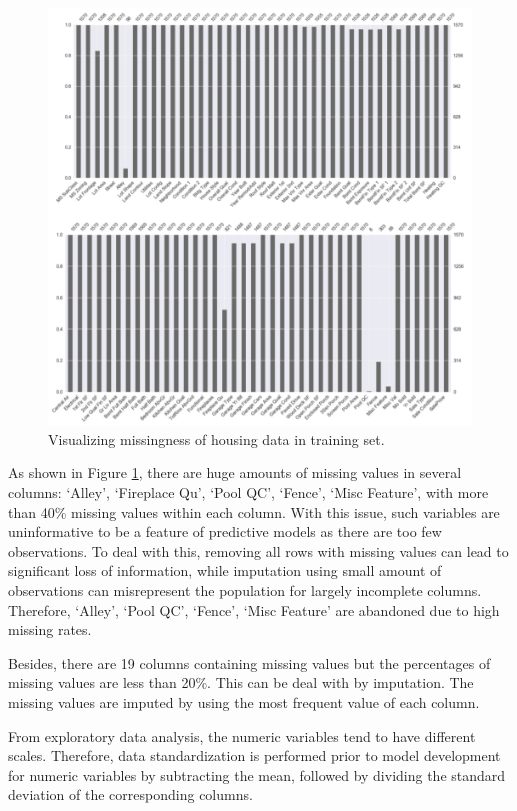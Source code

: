 \documentclass[letterpaper,12pt,twoside,]{pinp}
\begin{document}
\begin{figure}
\includegraphics[width=1\linewidth]{miss_plot.png}
\centering
\caption{Visualizing missingness of housing data in training set.}
\label{fig:miss}
\end{figure}

As shown in Figure \ref{fig:miss}, there are huge amounts of missing
values in several columns: `Alley', `Fireplace Qu', `Pool QC', `Fence',
`Misc Feature', with more than 40\% missing values within each column.
With this issue, such variables are uninformative to be a feature of
predictive models as there are too few observations. To deal with this,
removing all rows with missing values can lead to significant loss of
information, while imputation using small amount of observations can
misrepresent the population for largely incomplete columns. Therefore,
`Alley', `Pool QC', `Fence', `Misc Feature' are abandoned due to high
missing rates.

Besides, there are 19 columns containing missing values but the
percentages of missing values are less than 20\%. This can be deal with
by imputation. The missing values are imputed by using the most frequent
value of each column.

From exploratory data analysis, the numeric variables tend to have
different scales. Therefore, data standardization is performed prior to
model development for numeric variables by subtracting the mean,
followed by dividing the standard deviation of the corresponding
columns.
\end{document}
